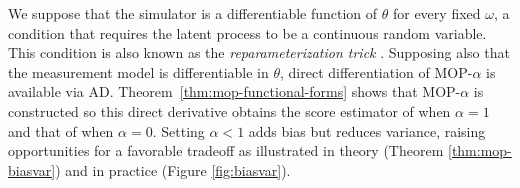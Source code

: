 \documentclass[9pt,twocolumn,pnasresearcharticle]{pnas-new}
\begin{document}
We suppose that the simulator is a differentiable function of $\theta$ for every fixed $\omega$, a condition that requires the latent process to be a continuous random variable. 
This condition is also known as the {\it reparameterization trick} \cite{corenflos21}.
Supposing also that the measurement model is differentiable in $\theta$, direct differentiation of MOP-$\alpha$ is available via AD.
Theorem~\ref{thm:mop-functional-forms} shows that MOP-$\alpha$ is constructed so this direct derivative obtains the score estimator of  \cite{poyiadjis11, scibior21} when $\alpha=1$ and that of \cite{naesseth18} when $\alpha=0$.
Setting $\alpha<1$ adds bias but reduces variance, raising opportunities for a favorable tradeoff as illustrated in theory (Theorem \ref{thm:mop-biasvar}) and in practice (Figure \ref{fig:biasvar}).
\end{document}
